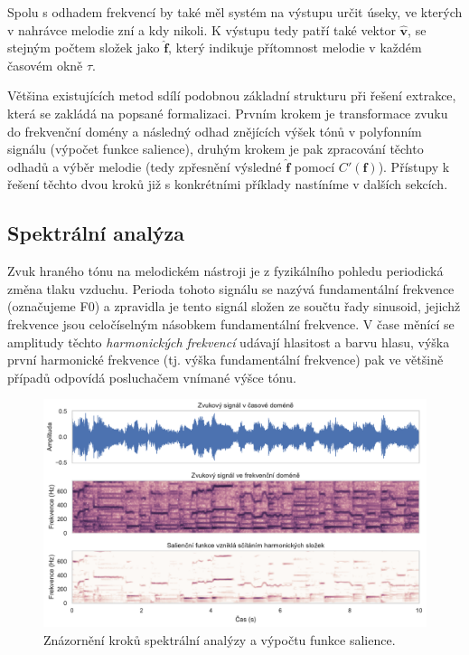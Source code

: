 Spolu s odhadem frekvencí by také měl systém na výstupu určit úseky, ve kterých v nahrávce melodie zní a kdy nikoli. K výstupu tedy patří také vektor $\hat{\mathbf{v}}$, se stejným počtem složek jako $\hat{\mathbf{f}}$, který indikuje přítomnost melodie v každém časovém okně $\tau$.

Většina existujících metod sdílí podobnou základní strukturu při řešení extrakce, která se zakládá na popsané formalizaci. Prvním krokem je transformace zvuku do frekvenční domény a následný odhad znějících výšek tónů v polyfonním signálu (výpočet funkce salience), druhým krokem je pak zpracování těchto odhadů a výběr melodie (tedy zpřesnění výsledné $\hat{\mathbf{f}}$ pomocí $C'(\mathbf{f})$). Přístupy k řešení těchto dvou kroků již s konkrétními příklady nastíníme v dalších sekcích.


\subsection{Spektrální analýza}

Zvuk hraného tónu na melodickém nástroji je z fyzikálního pohledu periodická změna tlaku vzduchu. Perioda tohoto signálu se nazývá fundamentální frekvence (označujeme F0) a zpravidla je tento signál složen ze součtu řady sinusoid, jejichž frekvence jsou celočíselným násobkem fundamentální frekvence. V čase měnící se amplitudy těchto \emph{harmonických frekvencí} udávají hlasitost a barvu hlasu, výška první harmonické frekvence (tj. výška fundamentální frekvence) pak ve většině případů odpovídá posluchačem vnímané výšce tónu. 

\begin{figure}[h]\centering
\includegraphics[width=\textwidth,height=\textheight,keepaspectratio]{../img/sig_spec_sal}
\caption{Znázornění kroků spektrální analýzy a výpočtu funkce salience.}
\label{obr:sig_spec_sal}
\end{figure}


